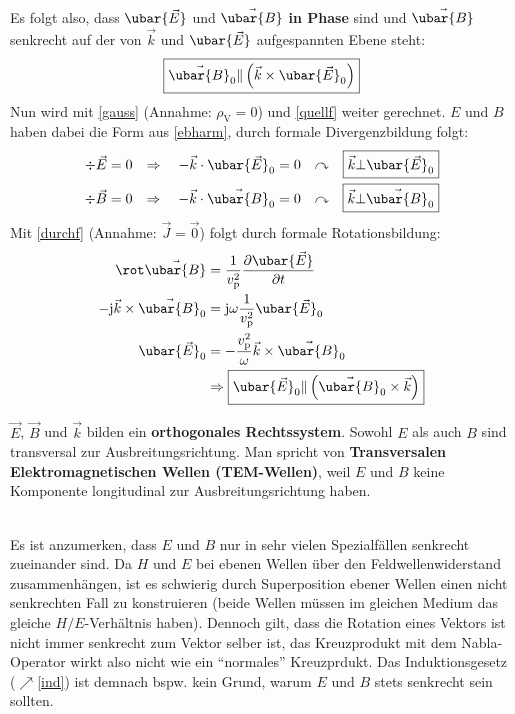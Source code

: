 		  Es folgt also, dass \( \ubar{\vec{E}}\) und \(\vec{\ubar{B}}\) \textbf{in Phase} sind und \(\vec{\ubar{B}}\) senkrecht auf der von \(\vec{k}\) und \(\ubar{\vec{E}}\) aufgespannten Ebene steht:
		        \begin{equation}
			       \boxed{ \vec{\ubar{B}}_0 \Vert \left(\vec{k} \times \ubar{\vec{E}}_0 \right)}
		        \end{equation}
 	Nun wird mit \ref{gauss} (Annahme: \(\rho_\text{V} = 0\)) und \ref{quellf} weiter gerechnet. $E$ und $B$ haben dabei die Form aus \ref{ebharm}, durch formale Divergenzbildung folgt:
		        \begin{align}
			        \div \vec{E} & = 0 & \Rightarrow \quad -\vec{k}\cdot \ubar{\vec{E}}_0 & = 0 & \curvearrowright &  & \boxed{\vec{k}\bot \ubar{\vec{E}}_0} \\
			        \div \vec{B} & = 0 & \Rightarrow \quad -\vec{k}\cdot \vec{\ubar{B}}_0 & = 0 & \curvearrowright &  & \boxed{\vec{k}\bot \vec{\ubar{B}}_0}
		        \end{align}
	Mit \ref{durchf} (Annahme: \(\vec{J}=\vec{0}\)) folgt durch formale Rotationsbildung:
		        \begin{align}
			        \rot \vec{\ubar{B}} &= \frac{1}{ v_{\mathrm{p}}^2}\frac{\partial \ubar{\vec{E}}}{\partial t} \nonumber\\
			         -\mathrm{j}\vec{k}\times\vec{\ubar{B}}_0 &= \mathrm{j}\omega\frac{1}{ v_{\mathrm{p}}^2}\ubar{\vec{E}}_0 \nonumber\\
			          \ubar{\vec{E}}_0 &= -\frac{ v_{\mathrm{p}}^2}{\omega}\vec{k} \times \vec{\ubar{B}}_0 \nonumber\\
			                                                                                                                                                                                                               & \Rightarrow  \boxed{\ubar{\vec{E}}_0 \| \left(\vec{\ubar{B}}_0 \times \vec{k} \right)}
		        \end{align}
 \begin{minipage}{.7\textwidth}
 	 \(\vec{E}\), \(\vec{B} \) und \(\vec{k}\) bilden ein \textbf{orthogonales Rechtssystem}. Sowohl $E$ als auch $B$ sind transversal zur Ausbreitungsrichtung. Man spricht von \textbf{Transversalen Elektromagnetischen Wellen (TEM-Wellen)}, weil $E$ und $B$ keine Komponente longitudinal zur Ausbreitungsrichtung haben. 
 \end{minipage}
 \begin{minipage}{.29\textwidth}
 	\raggedleft

 \end{minipage}\\
 Es ist anzumerken, dass $E$ und $B$ nur in sehr vielen Spezialfällen senkrecht zueinander sind. Da $H$ und $E$ bei ebenen Wellen über den Feldwellenwiderstand zusammenhängen, ist es schwierig durch Superposition ebener Wellen einen nicht senkrechten Fall zu konstruieren (beide Wellen müssen im gleichen Medium das gleiche $H/E$-Verhältnis haben). Dennoch gilt, dass die Rotation eines Vektors ist nicht immer senkrecht zum Vektor selber ist, das Kreuzprodukt mit dem Nabla-Operator wirkt also nicht wie ein \enquote{normales} Kreuzprdukt. Das Induktionsgesetz ($\nearrow$\ref{ind}) ist demnach bspw. kein Grund, warum $E$ und $B$ stets senkrecht sein sollten.
